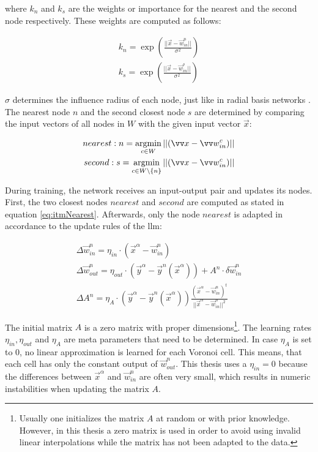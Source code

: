 where $k_n$ and $k_s$ are the weights or importance for the nearest and the second node respectively. These weights are computed as follows:

\begin{equation}
\begin{split}
k_n = \exp\left(\frac{||\vec{x}-\vec{w}^n_{in}||}{\sigma^2}\right) \\
k_s = \exp\left(\frac{||\vec{x}-\vec{w}^s_{in}||}{\sigma^2}\right) 
\end{split}
\end{equation}

$\sigma$ determines the influence radius of each node, just like in radial basis networks \cite{rbf}.
The nearest node $n$ and the second closest node $s$ are determined by comparing the input vectors of all nodes in $W$ with the given input vector $\vec{x}$:

\begin{equation}
\begin{split}
	nearest: n = \argmin_{c\in W} ||(\vec{x} - \vec{w}^c_{in})|| \\
	second: s = \argmin_{c\in W\backslash\{n\}} ||(\vec{x} - \vec{w}^c_{in})||
\end{split}
\label{eq:itmNearest}
\end{equation}

During training, the network receives an input-output pair and updates its nodes. First, the two closest nodes $nearest$ and $second$ are computed as stated in equation \ref{eq:itmNearest}. Afterwards, only the node $nearest$ is adapted in accordance to the update rules of the \gls{llm}:

\begin{equation}
\begin{split}
\Delta \vec{w}^n_{in} = \eta_{in} \cdot (\vec{x}^\alpha - \vec{w}^n_{in}) \\
\Delta \vec{w}^n_{out} = \eta_{out} \cdot (\vec{y}^\alpha - \vec{y}^n(\vec{x}^\alpha)) + A^n \cdot \delta \vec{w}^n_{in} \\
\Delta A^n = \eta_A \cdot (\vec{y}^\alpha - \vec{y}^n(\vec{x}^\alpha)) \frac{(\vec{x}^\alpha - \vec{w}^n_{in})^t}{||\vec{x}^\alpha - \vec{w}^n_{in}||^2}
\end{split}
\end{equation}

The initial matrix $A$ is a zero matrix with proper dimensions\footnote{Usually one initializes the matrix $A$ at random or with prior knowledge. However, in this thesis a zero matrix is used in order to avoid using invalid linear interpolations while the matrix has not been adapted to the data.}. 
The learning rates $\eta_{in}, \eta_{out}$ and $\eta_A$ are meta parameters that need to be determined. In case $\eta_A$ is set to 0, no linear approximation is learned for each Voronoi cell. This means, that each cell has only the constant output of $\vec{w}^n_{out}$. This thesis uses a $\eta_{in} = 0$ because the differences between $\vec{x}^\alpha$ and  $\vec{w}^n_{in}$ are often very small, which results in numeric instabilities when updating the matrix $A$. 

